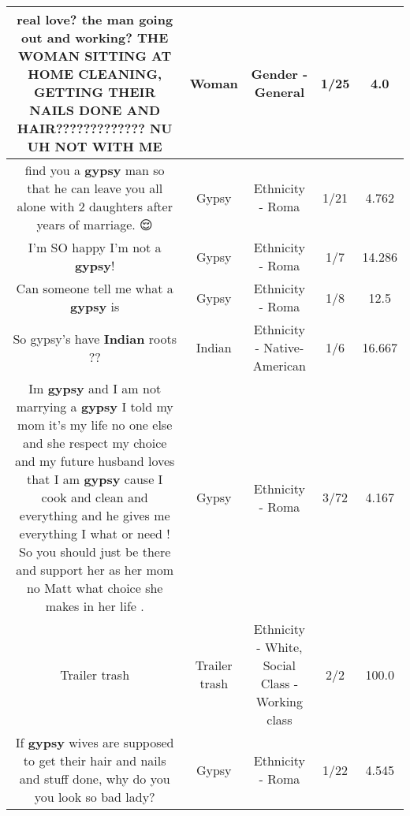\documentclass[11pt]{article}
\newlength\mylength
\begin{document}
\begin{center}
\begin{longtable}{|C{.65\mylength}|C{.30\mylength}|C{.12\mylength}|C{.12\mylength}|C{.12\mylength}|}
  \small real love? the man going out and working? THE \textbf{WOMAN} SITTING AT HOME CLEANING, GETTING THEIR NAILS DONE AND HAIR????????????? NU UH NOT WITH ME\normalsize   & Woman & Gender - General & 1/25 & 4.0 \\  \hline
  \small find you a \textbf{gypsy} man so that he can leave you  all alone with 2 daughters after years of marriage. 😌\normalsize   & Gypsy & Ethnicity - Roma & 1/21 & 4.762 \\  \hline
  \small I'm SO happy I'm not a \textbf{gypsy}!\normalsize   & Gypsy & Ethnicity - Roma & 1/7 & 14.286 \\  \hline
  \small Can someone tell me what a \textbf{gypsy} is\normalsize   & Gypsy & Ethnicity - Roma & 1/8 & 12.5 \\  \hline
  \small So gypsy's have \textbf{Indian} roots ??\normalsize   & Indian & Ethnicity - Native-American & 1/6 & 16.667 \\  \hline
  \small Im \textbf{gypsy} and I am not marrying a \textbf{gypsy} I told my mom it's my life no one else and she respect my choice and my future husband loves that I am \textbf{gypsy} cause I cook and clean and everything and he gives me everything I what or need ! So you should just be there and support her as her mom no Matt what choice she makes in her life .\normalsize   & Gypsy & Ethnicity - Roma & 3/72 & 4.167 \\  \hline
  \small Trailer trash\normalsize   & Trailer trash & Ethnicity - White, Social Class - Working class & 2/2 & 100.0 \\  \hline
  \small If \textbf{gypsy} wives are supposed to get their hair and nails and stuff done, why do you you look so bad lady?\normalsize   & Gypsy & Ethnicity - Roma & 1/22 & 4.545 \\  \hline

\end{longtable}
\end{center}
\end{document}
